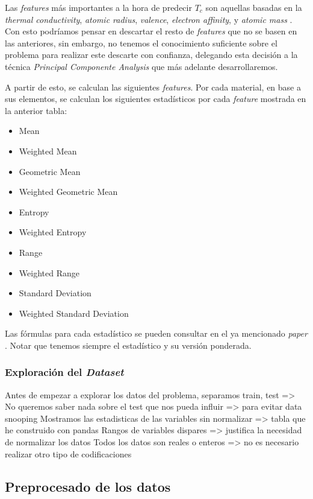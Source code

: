 \documentclass[11pt]{article}
\begin{document}
Las \emph{features} más importantes a la hora de predecir $T_c$ son aquellas basadas en la \emph{thermal conductivity}, \emph{atomic radius}, \emph{valence}, \emph{electron affinity}, y \emph{atomic mass} \cite{original_paper_reg:paper}. Con esto podríamos pensar en descartar el resto de \emph{features} que no se basen en las anteriores, sin embargo, no tenemos el conocimiento suficiente sobre el problema para realizar este descarte con confianza, delegando esta decisión a la técnica \emph{Principal Componente Analysis} que más adelante desarrollaremos.

A partir de esto, se calculan las siguientes \emph{features}. Por cada material, en base a sus elementos, se calculan los siguientes estadísticos por cada \emph{feature} mostrada en la anterior tabla:

\begin{itemize}
    \item Mean
    \item Weighted Mean
    \item Geometric Mean
    \item Weighted Geometric Mean
    \item Entropy
    \item Weighted Entropy
    \item Range
    \item Weighted Range
    \item Standard Deviation
    \item Weighted Standard Deviation
\end{itemize}

Las fórmulas para cada estadístico se pueden consultar en el ya mencionado \emph{paper} \cite{original_paper_reg:paper}. Notar que tenemos siempre el estadístico y su versión ponderada.

\subsubsection{Exploración del \emph{Dataset}}

Antes de empezar a explorar los datos del problema, separamos train, test => No queremos saber nada sobre el test que nos pueda influir => para evitar data snooping
Mostramos las estadisticas de las variables sin normalizar => tabla que he construido con pandas
Rangos de variables dispares => justifica la necesidad de normalizar los datos
Todos los datos son reales o enteros => no es necesario realizar otro tipo de codificaciones

\subsection{Preprocesado de los datos}
\end{document}
